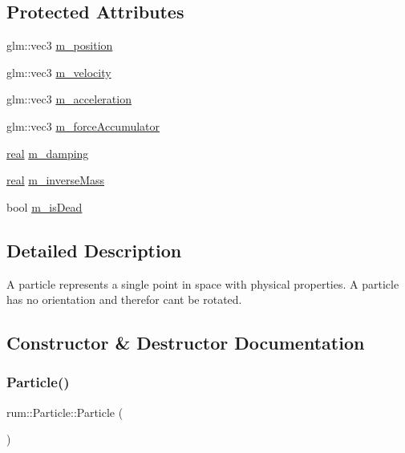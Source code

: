 \subsection*{Protected Attributes}
\begin{DoxyCompactItemize}
\item 
glm\+::vec3 \mbox{\hyperlink{classrum_1_1_particle_a6e7c397b620c9d03fb6c7d4359649d40}{m\+\_\+position}}
\item 
glm\+::vec3 \mbox{\hyperlink{classrum_1_1_particle_a8dfab481a4ef728d40e86f7369baf307}{m\+\_\+velocity}}
\item 
glm\+::vec3 \mbox{\hyperlink{classrum_1_1_particle_aee85fab3a2d274ecc7d997f1c0c34132}{m\+\_\+acceleration}}
\item 
glm\+::vec3 \mbox{\hyperlink{classrum_1_1_particle_a3f50187d7dd91c8c31309db3eb0cc5b4}{m\+\_\+force\+Accumulator}}
\item 
\mbox{\hyperlink{namespacerum_a7e8cca23573d5eaead0f138cbaa4862c}{real}} \mbox{\hyperlink{classrum_1_1_particle_a76f5e4b0ed29a1d86419230621dd1047}{m\+\_\+damping}}
\item 
\mbox{\hyperlink{namespacerum_a7e8cca23573d5eaead0f138cbaa4862c}{real}} \mbox{\hyperlink{classrum_1_1_particle_a7fa92aadbccc9d999d84cef129cf8870}{m\+\_\+inverse\+Mass}}
\item 
bool \mbox{\hyperlink{classrum_1_1_particle_ab056fc8b2187694c0742bd234b9cc6a3}{m\+\_\+is\+Dead}}
\end{DoxyCompactItemize}


\subsection{Detailed Description}
A particle represents a single point in space with physical properties. A particle has no orientation and therefor can\textquotesingle{}t be rotated. 

\subsection{Constructor \& Destructor Documentation}
\mbox{\label{classrum_1_1_particle_a9ae5ce0fc18a8be75950b336b92ecd75}} 
\subsubsection{\texorpdfstring{Particle()}{Particle()}}
{\footnotesize\ttfamily rum\+::\+Particle\+::\+Particle (\begin{DoxyParamCaption}{ }\end{DoxyParamCaption})\hspace{0.3cm}{\ttfamily [explicit]}}

